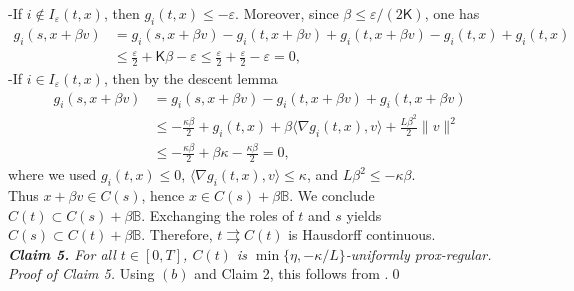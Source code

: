 \documentclass[preprint,12pt]{elsarticle}
\renewcommand{\epsilon}{\varepsilon}
\newcommand{\tto}{\rightrightarrows}
\theoremstyle{plain}
\theoremstyle{definition}
\theoremstyle{remark}
\begin{document}
-If $i\notin I_\epsilon(t,x)$, then $g_i(t,x)\leq -\epsilon$. Moreover, since $\beta \leq \epsilon/(2\mathsf{K})$, one has
	\begin{equation*}
		\begin{aligned}
			g_i(s,x+\beta v)& = g_i(s,x+\beta v)- g_i(t,x+\beta v) +g_i(t,x+\beta v)-g_i(t,x) + g_i(t,x)\\
			&\leq \frac{\epsilon}{2} + \mathsf{K}\beta -\epsilon \leq  \frac{\epsilon}{2} + \frac{\epsilon}{2} -\epsilon=0,
		\end{aligned}
	\end{equation*} 
-If $i\in I_{\epsilon}(t,x)$, then by the descent lemma
	\begin{equation*}
		\begin{aligned}
			g_i(s,x+\beta v) &= g_i(s,x+\beta v) - g_i(t,x+\beta v) + g_i(t,x+\beta v)\\
			&\leq  -\frac{\kappa\beta}{2} + g_i(t,x) + \beta\langle \nabla g_i(t,x),v\rangle + \frac{L\beta^2}{2}\|v\|^2\\
			&\leq  -\frac{\kappa\beta}{2} + \beta\kappa -\frac{\kappa\beta}{2} = 0,
		\end{aligned}
	\end{equation*}
where we used $g_i(t,x)\leq 0$, $\langle \nabla g_i(t,x),v\rangle \leq \kappa$, and $L\beta^2\leq -\kappa \beta$.\\
Thus $x+\beta v\in C(s)$, hence $x\in C(s)+\beta \mathbb{B}$. We conclude  $C(t)\subset C(s) + \beta\mathbb{B}$. Exchanging the roles of $t$ and $s$ yields $C(s)\subset C(t)+\beta\mathbb{B}$. Therefore, $t\tto C(t)$ is Hausdorff continuous.\\
\emph{{\bf Claim 5.} For all $t\in [0,T]$, $C(t)$ is $\min\{\eta,-\kappa/L\}$-uniformly prox-regular.}\\
\emph{Proof of Claim 5.} Using $(b)$ and Claim 2, this follows from  \cite[Corollary 15.101]{Thibault-2023-II}.\qed
\endgroup

	






\end{document}
